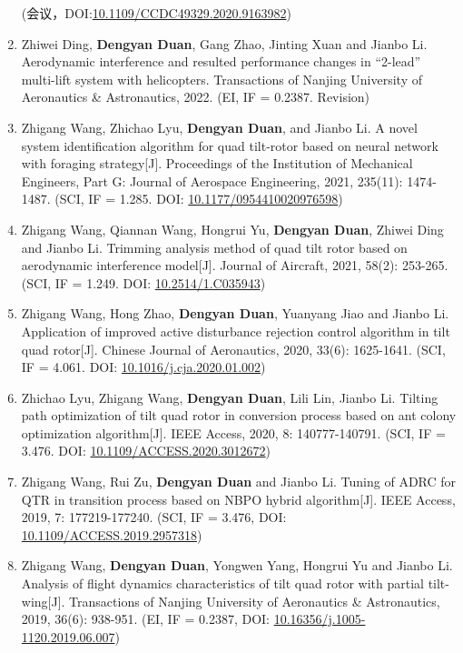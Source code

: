 \begin{enumerate}
  (会议，DOI:\href{https://doi.org/10.1109/CCDC49329.2020.9163982}{10.1109/CCDC49329.2020.9163982})
  \item Zhiwei Ding, \textbf{Dengyan Duan}, Gang Zhao, Jinting Xuan and Jianbo Li. Aerodynamic interference and resulted performance changes in “2-lead” multi-lift system with helicopters. Transactions of Nanjing University of Aeronautics \& Astronautics, 2022. (EI, IF = 0.2387. Revision)
  \item Zhigang Wang, Zhichao Lyu, \textbf{Dengyan Duan}, and Jianbo Li. A novel system identification algorithm for quad tilt-rotor based on neural network with foraging strategy[J]. Proceedings of the Institution of Mechanical Engineers, Part G: Journal of Aerospace Engineering, 2021, 235(11): 1474-1487. (SCI, IF = 1.285. DOI: \href{https://doi.org/10.1177/0954410020976598}{10.1177/0954410020976598})
  \item Zhigang Wang, Qiannan Wang, Hongrui Yu, \textbf{Dengyan Duan}, Zhiwei Ding and Jianbo Li. Trimming analysis method of quad tilt rotor based on aerodynamic interference model[J]. Journal of Aircraft, 2021, 58(2): 253-265. (SCI, IF = 1.249. DOI: \href{https://doi.org/10.2514/1.C035943}{10.2514/1.C035943})
  \item Zhigang Wang, Hong Zhao, \textbf{Dengyan Duan}, Yuanyang Jiao and Jianbo Li. Application of improved active disturbance rejection control algorithm in tilt quad rotor[J]. Chinese Journal of Aeronautics, 2020, 33(6): 1625-1641. (SCI, IF = 4.061. DOI: \href{https://doi.org/10.1016/j.cja.2020.01.002}{10.1016/j.cja.2020.01.002})
  \item Zhichao Lyu, Zhigang Wang, \textbf{Dengyan Duan}, Lili Lin, Jianbo Li. Tilting path optimization of tilt quad rotor in conversion process based on ant colony optimization algorithm[J]. IEEE Access, 2020, 8: 140777-140791. (SCI, IF = 3.476. DOI: \href{https://doi.org/10.1109/ACCESS.2020.3012672}{10.1109/ACCESS.2020.3012672})
  \item Zhigang Wang, Rui Zu, \textbf{Dengyan Duan} and Jianbo Li. Tuning of ADRC for QTR in transition process based on NBPO hybrid algorithm[J]. IEEE Access, 2019, 7: 177219-177240. (SCI, IF = 3.476, DOI: \href{https://doi.org/10.1109/ACCESS.2019.2957318}{10.1109/ACCESS.2019.2957318})
  \item Zhigang Wang, \textbf{Dengyan Duan}, Yongwen Yang, Hongrui Yu and Jianbo Li. Analysis of flight dynamics characteristics of tilt quad rotor with partial tilt-wing[J]. Transactions of Nanjing University of Aeronautics \& Astronautics, 2019, 36(6): 938-951. (EI, IF = 0.2387, DOI: \href{https://doi.org/10.16356/j.1005-1120.2019.06.007}{10.16356/j.1005-1120.2019.06.007})

\end{enumerate}
